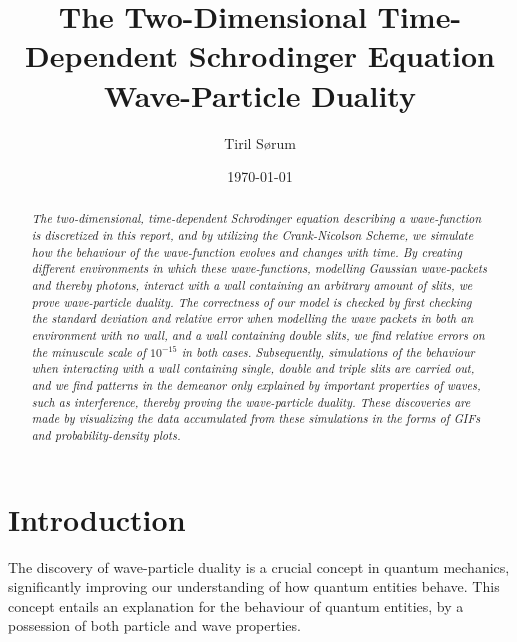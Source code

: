 \documentclass[10pt, nofootinbib, twocolumn]{revtex4-1}
\begin{document}
\vspace*{5\baselineskip}
\title{The Two-Dimensional Time-Dependent Schrodinger Equation \\ Wave-Particle Duality} 
\author{Tiril Sørum}
\date{\today}        
\begin{abstract}
\vspace*{3\baselineskip}
    \textit{The two-dimensional, time-dependent Schrodinger equation describing a wave-function is discretized in this report, and by utilizing \textit{the Crank-Nicolson Scheme}, we simulate how the behaviour of the wave-function evolves and changes with time. By creating different environments in which these wave-functions, modelling Gaussian wave-packets and thereby photons, interact with a wall containing an arbitrary amount of slits, we prove wave-particle duality. The correctness of our model is checked by first checking the standard deviation and relative error when modelling the wave packets in both an environment with no wall, and a wall containing double slits, we find relative errors on the minuscule scale of $10^{-15}$ in both cases. Subsequently, simulations of the behaviour when interacting with a wall containing single, double and triple slits are carried out, and we find patterns in the demeanor only explained by important properties of waves, such as interference, thereby proving the wave-particle duality. These discoveries are made by visualizing the data accumulated from these simulations in the forms of GIFs and probability-density plots. }
\end{abstract}
\maketitle       
\vspace*{2\baselineskip}
\section{Introduction}\label{sec:introduction}
The discovery of wave-particle duality is a crucial concept in quantum mechanics, significantly improving our understanding of how quantum entities behave. This concept entails an explanation for the behaviour of quantum entities, by a possession of both particle and wave properties. \\
\end{document}
